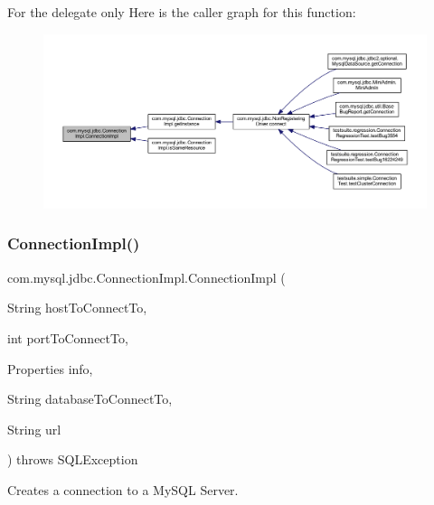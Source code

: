 \textquotesingle{} For the delegate only Here is the caller graph for this function\+:\nopagebreak
\begin{figure}[H]
\begin{center}
\leavevmode
\includegraphics[width=350pt]{classcom_1_1mysql_1_1jdbc_1_1_connection_impl_a3c11700ec151a1a13a2696b407161a34_icgraph}
\end{center}
\end{figure}
\mbox{\label{classcom_1_1mysql_1_1jdbc_1_1_connection_impl_afe73579e653474ca1773a609fe7863a1}} 
\subsubsection{\texorpdfstring{Connection\+Impl()}{ConnectionImpl()}\hspace{0.1cm}{\footnotesize\ttfamily [2/2]}}
{\footnotesize\ttfamily com.\+mysql.\+jdbc.\+Connection\+Impl.\+Connection\+Impl (\begin{DoxyParamCaption}\item[{String}]{host\+To\+Connect\+To,  }\item[{int}]{port\+To\+Connect\+To,  }\item[{Properties}]{info,  }\item[{String}]{database\+To\+Connect\+To,  }\item[{String}]{url }\end{DoxyParamCaption}) throws S\+Q\+L\+Exception}

Creates a connection to a My\+S\+QL Server.


